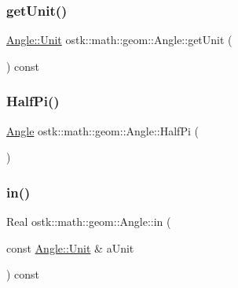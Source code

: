 \mbox{\label{classostk_1_1math_1_1geom_1_1_angle_ac00b6e24c10e4880a2d76a25f8e49095}} 
\subsubsection{\texorpdfstring{get\+Unit()}{getUnit()}}
{\footnotesize\ttfamily \hyperlink{classostk_1_1math_1_1geom_1_1_angle_abb73526d3f7f94a3b33e8358e1b18027}{Angle\+::\+Unit} ostk\+::math\+::geom\+::\+Angle\+::get\+Unit (\begin{DoxyParamCaption}{ }\end{DoxyParamCaption}) const}

\mbox{\label{classostk_1_1math_1_1geom_1_1_angle_a4d46804f16fdc67fc85cfa586e24c176}} 
\subsubsection{\texorpdfstring{Half\+Pi()}{HalfPi()}}
{\footnotesize\ttfamily \hyperlink{classostk_1_1math_1_1geom_1_1_angle}{Angle} ostk\+::math\+::geom\+::\+Angle\+::\+Half\+Pi (\begin{DoxyParamCaption}{ }\end{DoxyParamCaption})\hspace{0.3cm}{\ttfamily [static]}}

\mbox{\label{classostk_1_1math_1_1geom_1_1_angle_af7c5cff42aec2b9ccd6c246974df5d0c}} 
\subsubsection{\texorpdfstring{in()}{in()}}
{\footnotesize\ttfamily Real ostk\+::math\+::geom\+::\+Angle\+::in (\begin{DoxyParamCaption}\item[{const \hyperlink{classostk_1_1math_1_1geom_1_1_angle_abb73526d3f7f94a3b33e8358e1b18027}{Angle\+::\+Unit} \&}]{a\+Unit }\end{DoxyParamCaption}) const}

